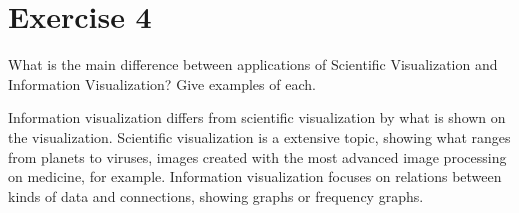\documentclass[english,a4paper]{article}
\begin{document}
\section*{Exercise 4}

  What is the main difference between applications of Scientific Visualization and Information Visualization?  Give examples of each.

  \begin{mdframed}
    \begin{small}
      Information visualization differs from scientific visualization by what is shown on the visualization. Scientific visualization is a extensive topic, showing what ranges from planets to viruses, images created with the most advanced image processing on medicine, for example. Information visualization focuses on relations between kinds of data and connections, showing graphs or frequency graphs.
    \end{small}
  \end{mdframed}
\end{document}

